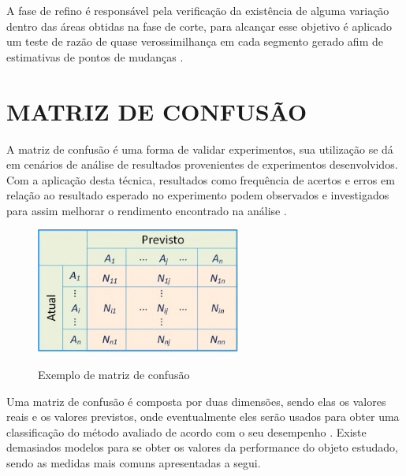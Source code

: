 A fase de refino é responsável pela verificação da existência de alguma variação dentro das áreas obtidas na fase de corte, para alcançar esse objetivo é aplicado um teste de razão de quase verossimilhança em cada segmento gerado afim de estimativas de pontos de mudanças \cite{Jin2016}.

\section{MATRIZ DE CONFUSÃO}
\label{sec:matrizDeConfusao}

A matriz de confusão é uma forma de validar experimentos, sua utilização se dá em cenários de análise de resultados provenientes de experimentos desenvolvidos. Com a aplicação desta técnica, resultados como frequência de acertos e erros em relação ao resultado esperado no experimento podem observados e investigados para assim melhorar o rendimento encontrado na análise \cite{Ruuska2018}.

\begin{figure}[!htb]
    \centering
    \caption{Exemplo de matriz de confusão}
    \includegraphics[width=0.6\textwidth]{./dados/figuras/matriz-de-confusao}
    \label{fig:matriz-confusao}
\end{figure}

Uma matriz de confusão é composta por duas dimensões, sendo elas os valores reais e os valores previstos, onde eventualmente eles serão usados para obter uma classificação do método avaliado de acordo com o seu desempenho \cite{Deng2016}. Existe demasiados modelos para se obter os valores da performance do objeto estudado, sendo as medidas mais comuns apresentadas a segui.

